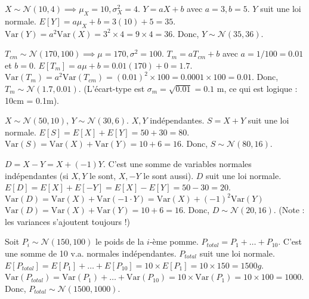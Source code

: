 \begin{correctionbox}
$X \sim \mathcal{N}(10, 4) \implies \mu_X=10, \sigma_X^2=4$. $Y = aX + b$ avec $a=3, b=5$.
$Y$ suit une loi normale.
$E[Y] = a\mu_X + b = 3(10) + 5 = 35$.
$\text{Var}(Y) = a^2 \text{Var}(X) = 3^2 \times 4 = 9 \times 4 = 36$.
Donc, $Y \sim \mathcal{N}(35, 36)$.
\end{correctionbox}

\begin{correctionbox}
$T_{cm} \sim \mathcal{N}(170, 100) \implies \mu=170, \sigma^2=100$.
$T_m = a T_{cm} + b$ avec $a=1/100 = 0.01$ et $b=0$.
$E[T_m] = a\mu + b = 0.01(170) + 0 = 1.7$.
$\text{Var}(T_m) = a^2 \text{Var}(T_{cm}) = (0.01)^2 \times 100 = 0.0001 \times 100 = 0.01$.
Donc, $T_m \sim \mathcal{N}(1.7, 0.01)$. (L'écart-type est $\sigma_m = \sqrt{0.01} = 0.1$ m, ce qui est logique : 10cm = 0.1m).
\end{correctionbox}

\begin{correctionbox}
$X \sim \mathcal{N}(50, 10)$, $Y \sim \mathcal{N}(30, 6)$. $X, Y$ indépendantes.
$S = X + Y$ suit une loi normale.
$E[S] = E[X] + E[Y] = 50 + 30 = 80$.
$\text{Var}(S) = \text{Var}(X) + \text{Var}(Y) = 10 + 6 = 16$.
Donc, $S \sim \mathcal{N}(80, 16)$.
\end{correctionbox}

\begin{correctionbox}
$D = X - Y = X + (-1)Y$. C'est une somme de variables normales indépendantes (si $X, Y$ le sont, $X, -Y$ le sont aussi). $D$ suit une loi normale.
$E[D] = E[X] + E[-Y] = E[X] - E[Y] = 50 - 30 = 20$.
$\text{Var}(D) = \text{Var}(X) + \text{Var}(-1 \cdot Y) = \text{Var}(X) + (-1)^2 \text{Var}(Y)$
$\text{Var}(D) = \text{Var}(X) + \text{Var}(Y) = 10 + 6 = 16$.
Donc, $D \sim \mathcal{N}(20, 16)$. (Note : les variances s'ajoutent toujours !)
\end{correctionbox}

\begin{correctionbox}
Soit $P_i \sim \mathcal{N}(150, 100)$ le poids de la $i$-ème pomme.
$P_{total} = P_1 + \dots + P_{10}$. C'est une somme de 10 v.a. normales indépendantes.
$P_{total}$ suit une loi normale.
$E[P_{total}] = E[P_1] + \dots + E[P_{10}] = 10 \times E[P_1] = 10 \times 150 = 1500g$.
$\text{Var}(P_{total}) = \text{Var}(P_1) + \dots + \text{Var}(P_{10}) = 10 \times \text{Var}(P_1) = 10 \times 100 = 1000$.
Donc, $P_{total} \sim \mathcal{N}(1500, 1000)$.
\end{correctionbox}

